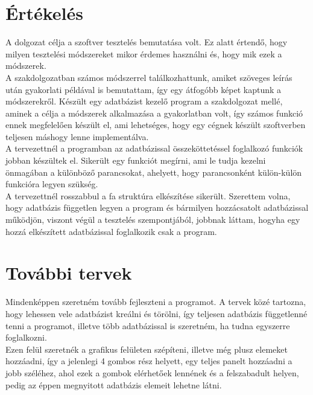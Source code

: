 

\section{Értékelés} A dolgozat célja a szoftver tesztelés bemutatása volt. Ez alatt értendő, hogy milyen tesztelési módszereket mikor érdemes használni és, hogy mik ezek a módszerek.\\

A szakdolgozatban számos módszerrel találkozhattunk, amiket szöveges leírás után gyakorlati példával is bemutattam, így egy átfogóbb képet kaptunk a módszerekről.
Készült egy adatbázist kezelő program a szakdolgozat mellé, aminek a célja a módszerek alkalmazása a gyakorlatban volt, így számos funkció ennek megfelelően készült el, ami lehetséges, hogy egy cégnek készült szoftverben teljesen máshogy lenne implementálva.\\

A tervezettnél a programban az adatbázissal összeköttetéssel foglalkozó funkciók jobban készültek el. Sikerült egy funkciót megírni, ami le tudja kezelni önmagában a különböző parancsokat, ahelyett, hogy parancsonként külön-külön funkcióra legyen szükség.\\

A tervezettnél rosszabbul a fa struktúra elkészítése sikerült. Szerettem volna, hogy adatbázis független legyen a program és bármilyen hozzácsatolt adatbázissal működjön, viszont végül a tesztelés szempontjából, jobbnak láttam, hogyha egy hozzá elkészített adatbázissal foglalkozik csak a program.

\section{További tervek} Mindenképpen szeretném tovább fejleszteni a programot. A tervek közé tartozna, hogy lehessen vele adatbázist kreálni és törölni, így teljesen adatbázis függetlenné tenni a programot, illetve több adatbázissal is szeretném, ha tudna egyszerre foglalkozni.\\

Ezen felül szeretnék a grafikus felületen szépíteni, illetve még plusz elemeket hozzáadni, így a jelenlegi 4 gombos rész helyett, egy teljes panelt hozzáadni a jobb széléhez, ahol ezek a gombok elérhetőek lennének és a felszabadult helyen, pedig az éppen megnyitott adatbázis elemeit lehetne látni.

